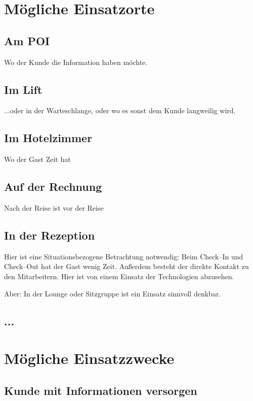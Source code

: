 \label{sec:hauptteil}

\section{Mögliche Einsatzorte}
\label{sec:einsatzorte}

\subsection{Am POI}
Wo der Kunde die Information haben möchte.

\subsection{Im Lift}
...oder in der Warteschlange, oder wo es sonst dem Kunde langweilig wird.

\subsection{Im Hotelzimmer}
Wo der Gast Zeit hat

\subsection{Auf der Rechnung}
Nach der Reise ist vor der Reise

\subsection{In der Rezeption}

Hier ist eine Situationsbezogene Betrachtung notwendig: Beim Check--In und Check--Out hat der Gast wenig Zeit. Außerdem besteht der direkte Kontakt zu den Mitarbeitern. Hier ist von einem Einsatz der Technologien abzusehen.

Aber: In der Lounge oder Sitzgruppe ist ein Einsatz sinnvoll denkbar.

\subsection{...}


\section{Mögliche Einsatzzwecke}
\label{sec:einsatzzwecke}

\subsection{Kunde mit Informationen versorgen}

